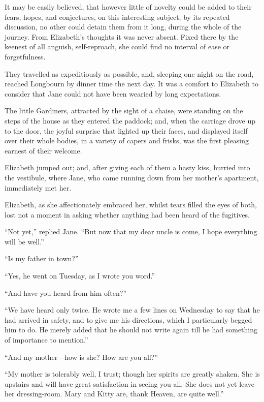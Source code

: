 \documentclass[12pt,english,oneside]{book}
\begin{document}
\bigskip{} It may be easily believed, that however little of novelty
could be added to their fears, hopes, and conjectures, on this interesting
subject, by its repeated discussion, no other could detain them from
it long, during the whole of the journey. From Elizabeth's thoughts
it was never absent. Fixed there by the keenest of all anguish, self-reproach,
she could find no interval of ease or forgetfulness.

They travelled as expeditiously as possible, and, sleeping one night
on the road, reached Longbourn by dinner time the next day. It was
a comfort to Elizabeth to consider that Jane could not have been wearied
by long expectations.

The little Gardiners, attracted by the sight of a chaise, were standing
on the steps of the house as they entered the paddock; and, when the
carriage drove up to the door, the joyful surprise that lighted up
their faces, and displayed itself over their whole bodies, in a variety
of capers and frisks, was the first pleasing earnest of their welcome.

Elizabeth jumped out; and, after giving each of them a hasty kiss,
hurried into the vestibule, where Jane, who came running down from
her mother's apartment, immediately met her.

Elizabeth, as she affectionately embraced her, whilst tears filled
the eyes of both, lost not a moment in asking whether anything had
been heard of the fugitives.

{}``Not yet,'' replied Jane. {}``But now that my dear uncle is
come, I hope everything will be well.''

{}``Is my father in town?''\ 

{}``Yes, he went on Tuesday, as I wrote you word.''

{}``And have you heard from him often?''\ 

{}``We have heard only twice. He wrote me a few lines on Wednesday
to say that he had arrived in safety, and to give me his directions,
which I particularly begged him to do. He merely added that he should
not write again till he had something of importance to mention.''

{}``And my mother\mbox{---}how is she? How are you all?''\ 

{}``My mother is tolerably well, I trust; though her spirits are
greatly shaken. She is upstairs and will have great satisfaction in
seeing you all. She does not yet leave her dressing-room. Mary and
Kitty are, thank Heaven, are quite well.''
\end{document}
